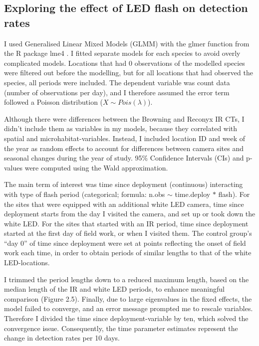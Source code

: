 	\subsection*{Exploring the effect of LED flash on detection rates}
I used Generalised Linear Mixed Models (GLMM) with the glmer function from the R package lme4 \autocite{R-lme4}.
I fitted separate models for each species to avoid overly complicated models. 
Locations that had 0 observations of the modelled species were filtered out before the modelling, but for all locations that had observed the species, all periods were included.
The dependent variable was count data (number of observations per day), and I therefore assumed the error term followed a Poisson distribution ($ X \sim Pois(\lambda) $).

Although there were differences between the Browning and Reconyx IR CTs, I didn't include them as variables in my models, because they correlated with spatial and microhabitat-variables.
Instead, I included location ID and week of the year as random effects to account for differences between camera sites and seasonal changes during the year of study. 
95\% Confidence Intervals (CIs) and p-values were computed using the Wald approximation.

The main term of interest was time since deployment (continuous) interacting with type of flash period (categorical; formula: n.obs $\sim$ time.deploy $\ast$ flash).
For the sites that were equipped with an additional white LED camera, time since deployment starts from the day I visited the camera, and set up or took down the white LED.
For the sites that started with an IR period, time since deployment started at the first day of field work, or when I visited them. 
The control group’s “day 0” of time since deployment were set at points reflecting the onset of field work each time, in order to obtain periods of similar lengths to that of the white LED-locations.

I trimmed the period lengths down to a reduced maximum length, based on the median length of the IR and white LED periods, to enhance meaningful comparison (Figure 2.5).
Finally, due to large eigenvalues in the fixed effects, the model failed to converge, and an error message prompted me to rescale variables.
Therefore I divided the time since deployment-variable by ten, which solved the convergence issue.
Consequently, the time parameter estimates represent the change in detection rates per 10 days. %

